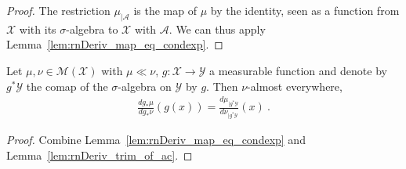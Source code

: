 \begin{proof}\mathlibok
{}
The restriction $\mu_{| \mathcal A}$ is the map of $\mu$ by the identity, seen as a function from $\mathcal X$ with its $\sigma$-algebra to $\mathcal X$ with $\mathcal{A}$.
We can thus apply Lemma~\ref{lem:rnDeriv_map_eq_condexp}.
\end{proof}


\begin{lemma}
  \label{lem:rnDeriv_map_eq_rnDeriv_trim}
  \uses{}
  Let $\mu, \nu \in \mathcal M(\mathcal X)$ with $\mu \ll \nu$, $g : \mathcal X \to \mathcal Y$ a measurable function and denote by $g^* \mathcal Y$ the comap of the $\sigma$-algebra on $\mathcal Y$ by $g$.
  Then $\nu$-almost everywhere,
  \begin{align*}
  \frac{d g_*\mu}{d g_*\nu}(g(x)) = \frac{d \mu_{| g^* \mathcal Y}}{d \nu_{| g^* \mathcal Y}}(x)
  \: .
  \end{align*}
\end{lemma}

\begin{proof}%
{}
Combine Lemma~\ref{lem:rnDeriv_map_eq_condexp} and Lemma~\ref{lem:rnDeriv_trim_of_ac}.
\end{proof}